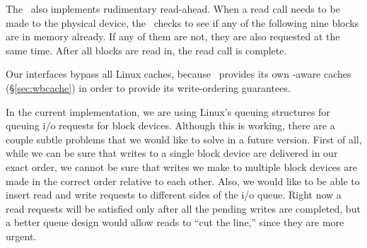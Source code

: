 The \module\ also implements rudimentary read-ahead. When a read call
needs to be made to the physical device, the \module\ checks to see if
any of the following nine blocks are in memory already. If any of them
are not, they are also requested at the same time. After all blocks
are read in, the read call is complete.

Our interfaces bypass all Linux caches, because \Kudos\ provides its
own \chdesc-aware caches (\S\ref{sec:wbcache}) in order to provide its
write-ordering guarantees.

In the current implementation, we are using Linux's queuing structures
for queuing i/o requests for block devices. Although this is working,
there are a couple subtle problems that we would like to solve in a
future version. First of all, while we can be sure that writes to a
single block device are delivered in our exact order, we cannot be
sure that writes we make to multiple block devices are made in the
correct order relative to each other. Also, we would like to be able
to insert read and write requests to different sides of the i/o
queue. Right now a read requests will be satisfied only after all the
pending writes are completed, but a better queue design would allow
reads to ``cut the line,'' since they are more urgent.

